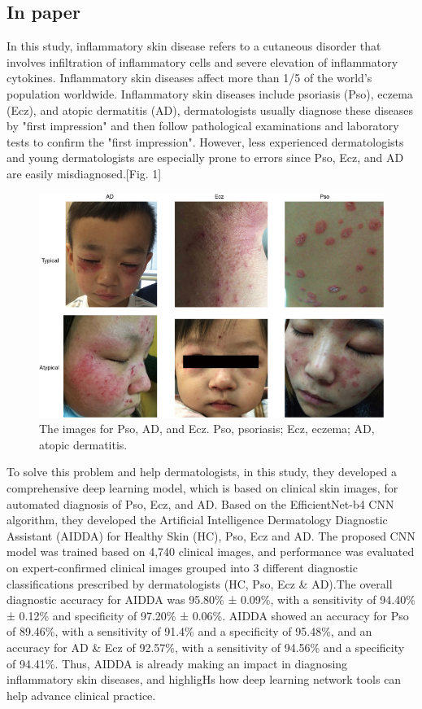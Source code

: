 \documentclass{article}
\begin{document}
\subsection{ In paper\cite{r2}}In this study, inflammatory skin disease refers to a cutaneous disorder that involves infiltration of inflammatory cells and severe elevation of inflammatory cytokines.
 Inflammatory skin diseases affect more than 1/5 of the world's population worldwide.
 Inflammatory skin diseases include psoriasis (Pso), eczema (Ecz), and atopic dermatitis (AD), dermatologists usually diagnose these diseases by "first impression" and then follow pathological examinations and laboratory tests to confirm the "first impression".
 However, less experienced dermatologists and young dermatologists are especially prone to errors since Pso, Ecz, and AD are easily misdiagnosed.[Fig. 1]
 \begin{figure}[H]
 \centering 
 \includegraphics{Figures/fig.jpg}
 \caption{The images for Pso, AD, and Ecz. Pso, psoriasis; Ecz, eczema; AD, atopic dermatitis.}
\end{figure}
To solve this problem and help dermatologists, in this study, they developed a comprehensive deep learning model, which is based on clinical skin images, for automated diagnosis of Pso, Ecz, and AD.
Based on the EfficientNet-b4 CNN algorithm, they developed the Artificial Intelligence Dermatology Diagnostic Assistant (AIDDA) for Healthy Skin (HC), Pso, Ecz and AD.
The proposed CNN model was trained based on 4,740 clinical images, and performance was evaluated on expert-confirmed clinical images grouped into 3 different diagnostic classifications prescribed by dermatologists (HC, Pso, Ecz \& AD).The overall diagnostic accuracy for AIDDA was 95.80\% ± 0.09\%, with a sensitivity of 94.40\% ± 0.12\% and specificity of 97.20\% ± 0.06\%. AIDDA showed an accuracy for Pso of 89.46\%, with a sensitivity of 91.4\% and a specificity of 95.48\%, and an accuracy for AD \& Ecz of 92.57\%, with a sensitivity of 94.56\% and a specificity of 94.41\%.
Thus, AIDDA is already making an impact in diagnosing inflammatory skin diseases, and highligHs how deep learning network tools can help advance clinical practice.
\end{document}
